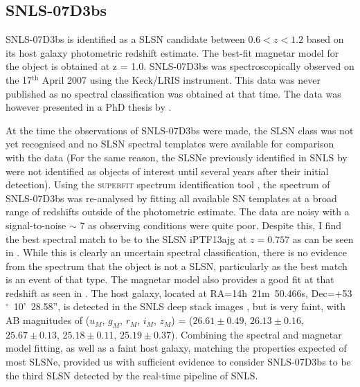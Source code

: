 \subsection{SNLS-07D3bs}
\label{sec:07D3bs}
SNLS-07D3bs is identified as a SLSN candidate between $0.6<z<1.2$ based on its host galaxy photometric redshift estimate. The best-fit magnetar model for the object is obtained at z = 1.0. SNLS-07D3bs was spectroscopically observed on the 17$^{\mathrm{th}}$ April 2007 using the Keck/LRIS instrument. This data was never published as no spectral classification was obtained at that time. The data was however presented in a PhD thesis by \citet{Fakhouri2013}.

At the time the observations of SNLS-07D3bs were made, the SLSN class was not yet recognised and no SLSN spectral templates were available for comparison with the data (For the same reason, the SLSNe previously identified in SNLS by \citet{Howell2013} were not identified as objects of interest until several years after their initial detection). Using the \textsc{superfit} spectrum identification tool \citep{Howell2005}, the spectrum of SNLS-07D3bs was re-analysed by fitting all available SN templates at a broad range of redshifts outside of the photometric estimate. The data are noisy with a signal-to-noise $\sim$ 7 as observing conditions were quite poor. Despite this, I find the best spectral match to be to the SLSN iPTF13ajg at $z=0.757$ as can be seen in . While this is clearly an uncertain spectral classification, there is no evidence from the spectrum that the object is not a SLSN, particularly as the best match is an event of that type. The magnetar model also provides a good fit at that redshift as seen in  . The host galaxy, located at RA=14h~21m~50.466s, Dec=+53$^{\circ}$~10'~28.58'', is detected in the SNLS deep stack images \citep{Ilbert2006}, but is very faint, with AB magnitudes of ($u_M$, $g_M$, $r_M$, $i_M$, $z_M$) = ($26.61\pm0.49$, $26.13\pm0.16$, $25.67\pm0.13$, $25.18\pm0.11$, $25.19\pm0.37$). Combining the spectral and magnetar model fitting, as well as a faint host galaxy, matching the properties expected of most SLSNe, provided us with sufficient evidence to consider SNLS-07D3bs to be the third SLSN detected by the real-time pipeline of SNLS.

